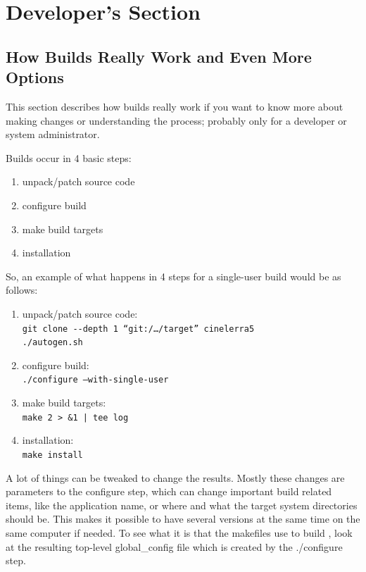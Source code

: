 \chapter{Developer's Section}%
\label{cha:developer's_section}

\section{How Builds Really Work and Even More Options}
\label{sec:builds_really_work_more_options}

This section describes how builds really work if you want to know more about making changes or understanding the process; probably only for a developer or system administrator.

Builds occur in 4 basic steps:

\begin{enumerate}[nosep]
	\item unpack/patch source code
	\item configure build
	\item make build targets
	\item installation
\end{enumerate}

So, an example of what happens in 4 steps for a single-user build would be as follows:

\begin{enumerate}[nosep]
	\item unpack/patch source code: \\
	\texttt{git clone -{}-depth 1 ``git:/{\dots}/target'' cinelerra5} \\
	\texttt{./autogen.sh}
	\item configure build:\\
	\texttt{./configure --with-single-user}
	\item make build targets:\\
	\texttt{make 2 > \&1 | tee log}
	\item installation:\\
	\texttt{make install}
\end{enumerate}

A lot of things can be tweaked to change the results. Mostly these changes are parameters to the configure step, which can change important build related items, like the application name, or where and what the target system directories should be. This makes it possible to have several versions at the same time on the same computer if needed. To see what it is that the makefiles use to build \CGG{}, look at the resulting top-level global\_config file which is created by the ./configure step.

